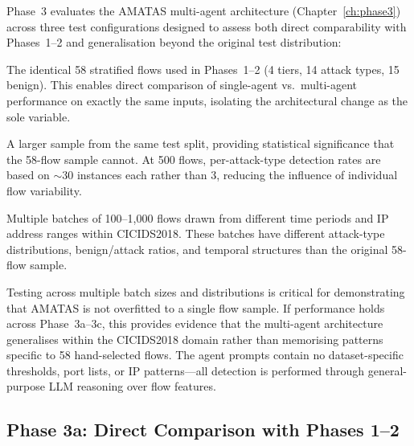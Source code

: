 \documentclass[12pt, a4paper, oneside]{report}
\begin{document}
Phase~3 evaluates the AMATAS multi-agent architecture
(Chapter~\ref{ch:phase3}) across three test configurations designed to
assess both direct comparability with Phases~1--2 and generalisation beyond
the original test distribution:

\begin{description}[style=nextline, leftmargin=2em]
  \item[Phase 3a: 58-flow mini batch]
    The identical 58 stratified flows used in Phases~1--2 (4 tiers, 14
    attack types, 15 benign). This enables direct comparison of
    single-agent vs.\ multi-agent performance on exactly the same inputs,
    isolating the architectural change as the sole variable.

  \item[Phase 3b: $\sim$500-flow full batch]
    A larger sample from the same test split, providing statistical
    significance that the 58-flow sample cannot. At 500 flows, per-attack-type
    detection rates are based on $\sim$30 instances each rather than 3,
    reducing the influence of individual flow variability.

  \item[Phase 3c: Medium batches (cross-distribution)]
    Multiple batches of 100--1{,}000 flows drawn from different time periods
    and IP address ranges within CICIDS2018. These batches have different
    attack-type distributions, benign/attack ratios, and temporal structures
    than the original 58-flow sample.
\end{description}

Testing across multiple batch sizes and distributions is critical for
demonstrating that AMATAS is not overfitted to a single flow sample. If
performance holds across Phase~3a--3c, this provides evidence that the
multi-agent architecture generalises within the CICIDS2018 domain rather than
memorising patterns specific to 58 hand-selected flows. The agent prompts
contain no dataset-specific thresholds, port lists, or IP patterns---all
detection is performed through general-purpose LLM reasoning over flow features.


\subsection{Phase 3a: Direct Comparison with Phases 1--2}
\end{document}
